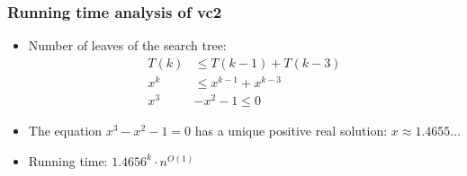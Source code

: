 %


\begin{frame}
 \frametitle{Running time analysis of vc2}

  \begin{itemize}
  	\item Number of leaves of the search tree:
         \begin{align*}  
            T(k) &\le T(k-1)+T(k-3)\\
            x^k  &\le x^{k-1}+x^{k-3}\\
            x^3  &- x^2 - 1 \le 0
         \end{align*}
   \item The equation $x^3 - x^2 - 1 = 0$ has a unique positive real solution: $x \approx 1.4655\ldots$
   \item Running time: $1.4656^k \cdot n^{O(1)}$
  \end{itemize}

\end{frame}

